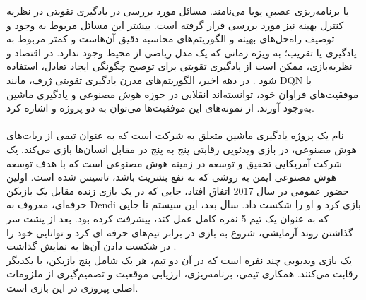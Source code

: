   یا برنامه‌ریزی عصبیِ پویا
       می‌نامند. مسائل مورد بررسی در یادگیری تقویتی در نظریه کنترل بهینه
         نیز مورد بررسی قرار گرفته است. بیشتر این مسائل مربوط به وجود و توصیف راه‌حل‌های بهینه و الگوریتم‌های محاسبه دقیق آن‌هاست و کمتر مربوط به یادگیری یا تقریب؛ به ویژه زمانی که یک مدل ریاضی از محیط وجود ندارد. در اقتصاد و نظریه‌بازی، ممکن است از یادگیری تقویتی برای توضیح چگونگی ایجاد تعادل، استفاده شود
\cite{mldef}.
در دهه اخیر، الگوریتم‌های مدرن یادگیری تقویتی ژرف، مانند DQN با موفقیت‌های فراوان خود، توانسته‌اند انقلابی در حوزه هوش مصنوعی و یادگیری ماشین به‌وجود آورند. از نمونه‌های این موفقیت‌ها می‌توان به دو پروژه
 و
   اشاره کرد.
\paragraph{}  
   نام یک پروژه یادگیری ماشین متعلق به شرکت 
   است که به عنوان تیمی از ربات‌های هوش مصنوعی، در بازی ویدئویی رقابتی پنج به پنج 
     در مقابل انسان‌ها بازی می‌کند.
 یک شرکت آمریکایی تحقیق و توسعه در زمینه هوش مصنوعی است که با هدف توسعه هوش مصنوعی ایمن به روشی که به نفع بشریت باشد، تاسیس شده است. اولین حضور عمومی
  در سال 2017 اتفاق افتاد، جایی که در یک بازی زنده مقابل یک بازیکن حرفه‌ای، معروف به Dendi بازی کرد و او را شکست داد. سال بعد، این سیستم تا جایی که به عنوان یک تیم 5 نفره کامل عمل کند، پیشرفت کرده بود. 
  بعد از پشت سر گذاشتن روند آزمایشی، شروع به بازی در برابر تیم‌های حرفه ای کرد و توانایی خود را در شکست دادن آن‌ها به نمایش گذاشت
\cite{openai}.\\
  یک بازی ویدیویی چند نفره است که در آن دو تیم، هر یک شامل پنج بازیکن، با یکدیگر رقابت می‌کنند. همکاری تیمی، برنامه‌ریزی، ارزیابی موقعیت و تصمیم‌گیری از ملزومات اصلی پیروزی در این بازی است.
   
   
   

%
  
